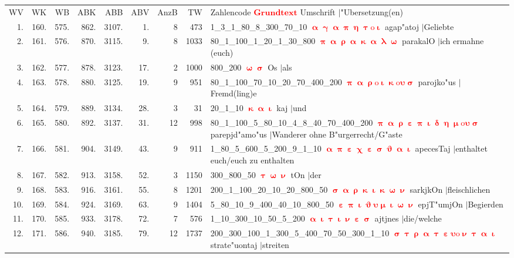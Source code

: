 \documentclass[a4paper,10pt,landscape]{article}
\begin{document}
\begin{tabular}{rrrrrrrrp{120mm}}
WV&WK&WB&ABK&ABB&ABV&AnzB&TW&Zahlencode \textcolor{red}{$\boldsymbol{Grundtext}$} Umschrift $|$"Ubersetzung(en)\\
1.&160.&575.&862.&3107.&1.&8&473&1\_3\_1\_80\_8\_300\_70\_10 \textcolor{red}{$\boldsymbol{\upalpha\upgamma\upalpha\uppi\upeta\uptau\mathrm{o}\upiota}$} agap"atoj $|$Geliebte\\
2.&161.&576.&870.&3115.&9.&8&1033&80\_1\_100\_1\_20\_1\_30\_800 \textcolor{red}{$\boldsymbol{\uppi\upalpha\uprho\upalpha\upkappa\upalpha\uplambda\upomega}$} parakalO $|$ich ermahne (euch)\\
3.&162.&577.&878.&3123.&17.&2&1000&800\_200 \textcolor{red}{$\boldsymbol{\upomega\upsigma}$} Os $|$als\\
4.&163.&578.&880.&3125.&19.&9&951&80\_1\_100\_70\_10\_20\_70\_400\_200 \textcolor{red}{$\boldsymbol{\uppi\upalpha\uprho\mathrm{o}\upiota\upkappa\mathrm{o}\upsilon\upsigma}$} parojko"us $|$Fremd(ling)e\\
5.&164.&579.&889.&3134.&28.&3&31&20\_1\_10 \textcolor{red}{$\boldsymbol{\upkappa\upalpha\upiota}$} kaj $|$und\\
6.&165.&580.&892.&3137.&31.&12&998&80\_1\_100\_5\_80\_10\_4\_8\_40\_70\_400\_200 \textcolor{red}{$\boldsymbol{\uppi\upalpha\uprho\upepsilon\uppi\upiota\updelta\upeta\upmu\mathrm{o}\upsilon\upsigma}$} parepjd"amo"us $|$Wanderer ohne B"urgerrecht/G"aste\\
7.&166.&581.&904.&3149.&43.&9&911&1\_80\_5\_600\_5\_200\_9\_1\_10 \textcolor{red}{$\boldsymbol{\upalpha\uppi\upepsilon\upchi\upepsilon\upsigma\upvartheta\upalpha\upiota}$} apecesTaj $|$enthaltet euch/euch zu enthalten\\
8.&167.&582.&913.&3158.&52.&3&1150&300\_800\_50 \textcolor{red}{$\boldsymbol{\uptau\upomega\upnu}$} tOn $|$der\\
9.&168.&583.&916.&3161.&55.&8&1201&200\_1\_100\_20\_10\_20\_800\_50 \textcolor{red}{$\boldsymbol{\upsigma\upalpha\uprho\upkappa\upiota\upkappa\upomega\upnu}$} sarkjkOn $|$fleischlichen\\
10.&169.&584.&924.&3169.&63.&9&1404&5\_80\_10\_9\_400\_40\_10\_800\_50 \textcolor{red}{$\boldsymbol{\upepsilon\uppi\upiota\upvartheta\upsilon\upmu\upiota\upomega\upnu}$} epjT"umjOn $|$Begierden\\
11.&170.&585.&933.&3178.&72.&7&576&1\_10\_300\_10\_50\_5\_200 \textcolor{red}{$\boldsymbol{\upalpha\upiota\uptau\upiota\upnu\upepsilon\upsigma}$} ajtjnes $|$die/welche\\
12.&171.&586.&940.&3185.&79.&12&1737&200\_300\_100\_1\_300\_5\_400\_70\_50\_300\_1\_10 \textcolor{red}{$\boldsymbol{\upsigma\uptau\uprho\upalpha\uptau\upepsilon\upsilon\mathrm{o}\upnu\uptau\upalpha\upiota}$} strate"uontaj $|$streiten\\

\end{tabular}
\end{document}

